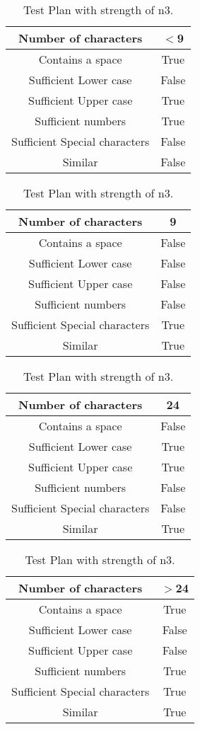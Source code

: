 \documentclass[12pt,letterpaper]{article}
\begin{document}
\begin{table}[h!]
  \begin{center}
    \caption{Test Plan with strength of n3.}
    \label{tab:table1}
    
    \begin{tabular}{||c|c||}
    \hline
	Number of characters & $<$9 \\
	\hline
	Contains a space & True \\
	\hline
	Sufficient Lower case & False \\
	\hline
	Sufficient Upper case& True \\
	\hline
	Sufficient numbers & True \\
	\hline
	Sufficient Special characters & False \\
	Similar & False \\
    \hline
    \end{tabular}

    \begin{tabular}{||c|c||}
    \hline
	Number of characters & 9 \\
	\hline
	Contains a space & False \\
	\hline
	Sufficient Lower case & False \\
	\hline
	Sufficient Upper case& False \\
	\hline
	Sufficient numbers & False \\
	\hline
	Sufficient Special characters & True \\
	Similar & True \\
    \hline
    \end{tabular}    

    \begin{tabular}{||c|c||}
    \hline
	Number of characters & 24 \\
	\hline
	Contains a space & False \\
	\hline
	Sufficient Lower case & True \\
	\hline
	Sufficient Upper case& True \\
	\hline
	Sufficient numbers & False \\
	\hline
	Sufficient Special characters & False \\
	Similar & True \\
    \hline
    \end{tabular}
    
    \begin{tabular}{||c|c||}
    \hline
	Number of characters & $>$24 \\
	\hline
	Contains a space & True \\
	\hline
	Sufficient Lower case & False \\
	\hline
	Sufficient Upper case& False \\
	\hline
	Sufficient numbers & True \\
	\hline
	Sufficient Special characters & True \\
	Similar & True \\
    \hline
    \end{tabular}
    

\end{center}
\end{table}
\end{document}
